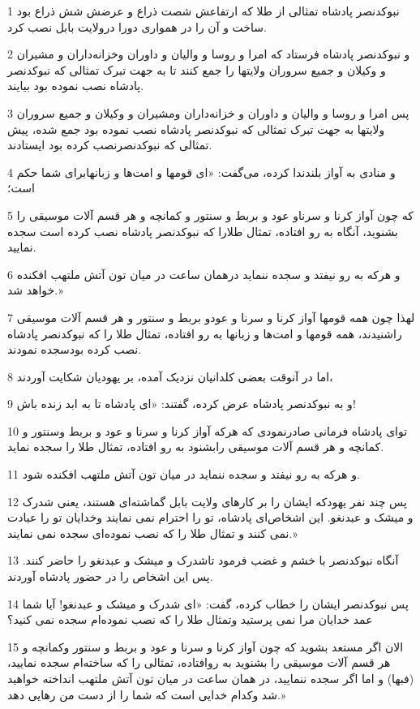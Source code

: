 \par 1 نبوکدنصر پادشاه تمثالی از طلا که ارتفاعش شصت ذراع و عرضش شش ذراع بود ساخت و آن را در همواری دورا درولایت بابل نصب کرد.
\par 2 و نبوکدنصر پادشاه فرستاد که امرا و روسا و والیان و داوران وخزانه‌داران و مشیران و وکیلان و جمیع سروران ولایتها را جمع کنند تا به جهت تبرک تمثالی که نبوکدنصر پادشاه نصب نموده بود بیایند.
\par 3 پس امرا و روسا و والیان و داوران و خزانه‌داران ومشیران و وکیلان و جمیع سروران ولایتها به جهت تبرک تمثالی که نبوکدنصر پادشاه نصب نموده بود جمع شده، پیش تمثالی که نبوکدنصرنصب کرده بود ایستادند.
\par 4 و منادی به آواز بلندندا کرده، می‌گفت: «ای قومها و امت‌ها و زبانهابرای شما حکم است؛
\par 5 که چون آواز کرنا و سرناو عود و بربط و سنتور و کمانچه و هر قسم آلات موسیقی را بشنوید، آنگاه به رو افتاده، تمثال طلارا که نبوکدنصر پادشاه نصب کرده است سجده نمایید.
\par 6 و هر‌که به رو نیفتد و سجده ننماید درهمان ساعت در میان تون آتش ملتهب افکنده خواهد شد.»
\par 7 لهذا چون همه قومها آواز کرنا و سرنا و عودو بربط و سنتور و هر قسم آلات موسیقی راشنیدند، همه قومها و امت‌ها و زبانها به رو افتاده، تمثال طلا را که نبوکدنصر پادشاه نصب کرده بودسجده نمودند.
\par 8 اما در آنوقت بعضی کلدانیان نزدیک آمده، بر یهودیان شکایت آوردند،
\par 9 و به نبوکدنصر پادشاه عرض کرده، گفتند: «ای پادشاه تا به ابد زنده باش!
\par 10 تو‌ای پادشاه فرمانی صادرنمودی که هر‌که آواز کرنا و سرنا و عود و بربط وسنتور و کمانچه و هر قسم آلات موسیقی رابشنود به رو افتاده، تمثال طلا را سجده نماید.
\par 11 و هر‌که به رو نیفتد و سجده ننماید در میان تون آتش ملتهب افکنده شود.
\par 12 پس چند نفر یهودکه ایشان را بر کارهای ولایت بابل گماشته‌ای هستند، یعنی شدرک و میشک و عبدنغو. این اشخاص‌ای پادشاه، تو را احترام نمی نمایند وخدایان تو را عبادت نمی کنند و تمثال طلا را که نصب نموده‌ای سجده نمی نمایند.»
\par 13 آنگاه نبوکدنصر با خشم و غضب فرمود تاشدرک و میشک و عبدنغو را حاضر کنند. پس این اشخاص را در حضور پادشاه آوردند.
\par 14 پس نبوکدنصر ایشان را خطاب کرده، گفت: «ای شدرک و میشک و عبدنغو! آیا شما عمد خدایان مرا نمی پرستید وتمثال طلا را که نصب نموده‌ام سجده نمی کنید؟
\par 15 الان اگر مستعد بشوید که چون آواز کرنا و سرنا و عود و بربط و سنتور وکمانچه و هر قسم آلات موسیقی را بشنوید به روافتاده، تمثالی را که ساخته‌ام سجده نمایید، (فبها) و اما اگر سجده ننمایید، در همان ساعت در میان تون آتش ملتهب انداخته خواهید شد وکدام خدایی است که شما را از دست من رهایی دهد.»
